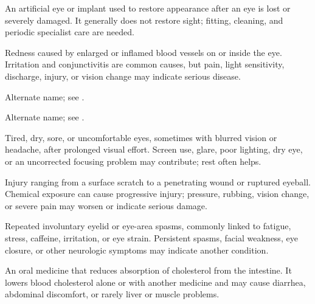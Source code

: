  An artificial eye or implant used to restore appearance after an eye is lost or severely damaged. It generally does not restore sight; fitting, cleaning, and periodic specialist care are needed.

 Redness caused by enlarged or inflamed blood vessels on or inside the eye. Irritation and conjunctivitis are common causes, but pain, light sensitivity, discharge, injury, or vision change may indicate serious disease.

 Alternate name; see .

 Alternate name; see .

 Tired, dry, sore, or uncomfortable eyes, sometimes with blurred vision or headache, after prolonged visual effort. Screen use, glare, poor lighting, dry eye, or an uncorrected focusing problem may contribute; rest often helps.

 Injury ranging from a surface scratch to a penetrating wound or ruptured eyeball. Chemical exposure can cause progressive injury; pressure, rubbing, vision change, or severe pain may worsen or indicate serious damage.

 Repeated involuntary eyelid or eye-area spasms, commonly linked to fatigue, stress, caffeine, irritation, or eye strain. Persistent spasms, facial weakness, eye closure, or other neurologic symptoms may indicate another condition.

 An oral medicine that reduces absorption of cholesterol from the intestine. It lowers blood cholesterol alone or with another medicine and may cause diarrhea, abdominal discomfort, or rarely liver or muscle problems.
